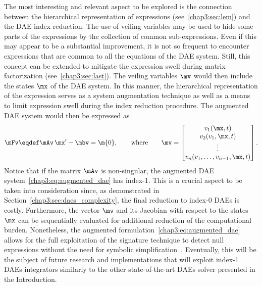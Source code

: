 The most interesting and relevant aspect to be explored is the connection between the hierarchical representation of expressions (see~\ref{chap3:sec:lem}) and the \ac{DAE} index reduction. The use of veiling variables may be used to hide some parts of the expressions by the collection of common sub-expressions. Even if this may appear to be a substantial improvement, it is not so frequent to encounter expressions that are common to all the equations of the \ac{DAE} system. Still, this concept can be extended to mitigate the expression swell during matrix factorization (see~\ref{chap3:sec:last}). The veiling variables $\mv$ would then include the states $\mx$ of the \ac{DAE} system. In this manner, the hierarchical representation of the expression serves as a system augmentation technique as well as a means to limit expression swell during the index reduction procedure. The augmented \ac{DAE} system would then be expressed as
%
\begin{equation}
  \label{chap3:eq:augmented_dae}
  \mFv \eqdef \mAv \, \mx^\prime - \mbv = \m{0},
  \qquad \text{where} \qquad
  \mv = \begin{bmatrix}
    v_{1}(\mx, t) \\
    v_{2}(v_{1}, \mx, t) \\
    \vdots \\
    v_{n}(v_{1}, \dots, v_{n-1}, \mx, t) \\
  \end{bmatrix}.
\end{equation}
%
Notice that if the matrix $\mAv$ is non-singular, the augmented \ac{DAE} system~\eqref{chap3:eq:augmented_dae} has index-1. This is a crucial aspect to be taken into consideration since, as demonstrated in Section~\ref{chap3:sec:daes_complexity}, the final reduction to index-0 \acp{DAE} is costly. Furthermore, the vector $\mv$ and its Jacobian with respect to the states $\mx$ can be sequentially evaluated for additional reduction of the computational burden. Nonetheless, the augmented formulation~\eqref{chap3:eq:augmented_dae} allows for the full exploitation of the signature technique to detect null expressions without the need for symbolic simplification~\cite{monagan1994signature}. Eventually, this will be the subject of future research and implementations that will exploit index-1 \acp{DAE} integrators similarly to the other state-of-the-art \acp{DAE} solver presented in the Introduction.

